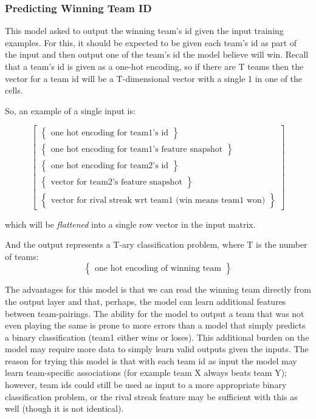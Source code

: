 \documentclass{article} %
\begin{document}
\subsubsection{Predicting Winning Team ID}
\label{sec:io-architectures-winning-team-id}

This model asked to output the winning team's id given the input training examples.
For this, it should be expected to be given each team's id as part of the input and then output one of the team's id the model believe will win.
Recall that a team's id is given as a one-hot encoding, so if there are T teams then the vector for a team id will be a T-dimensional vector with a single 1 in one of the cells.

So, an example of a single input is:

\[
\begin{bmatrix}
  \begin{Bmatrix}
    \text{one hot encoding for team1's id}
  \end{Bmatrix}
  \\
  \begin{Bmatrix}
    \text{one hot encoding for team1's feature snapshot}
  \end{Bmatrix}
  \\
  \begin{Bmatrix}
    \text{one hot encoding for team2's id}
  \end{Bmatrix}
  \\
  \begin{Bmatrix}
    \text{vector for team2's feature snapshot}
  \end{Bmatrix}
  \\
  \begin{Bmatrix}
    \text{vector for rival streak wrt team1 (win means team1 won)}
  \end{Bmatrix}
\end{bmatrix}
\]

which will be \textit{flattened} into a single row vector in the input matrix.

And the output represents a T-ary classification problem, where T is the number of teams:
\[
\begin{Bmatrix}
  \text{one hot encoding of winning team}
\end{Bmatrix}
\]


The advantages for this model is that we can read the winning team directly from the output layer and that, perhaps, the model can learn additional features between team-pairings.
The ability for the model to output a team that was not even playing the same is prone to more errors than a model that simply predicts a binary classification (team1 either wins or loses).
This additional burden on the model may require more data to simply learn valid outputs given the inputs.
The reason for trying this model is that with each team id as input the model may learn team-specific associations (for example team X always beats team Y); however, team ids could still be used as input to a more appropriate binary classification problem, or the rival streak feature may be sufficient with this as well (though it is not identical).
\end{document}
